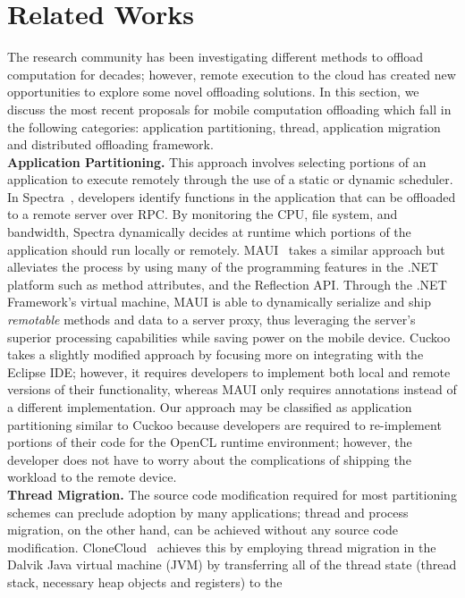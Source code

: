 \documentclass[10pt, conference, compsocconf]{IEEEtran}
\begin{document}
\section{Related Works}
%
The research community has been investigating different methods to
offload computation for decades; however, remote execution to the cloud
has created new opportunities to explore some novel offloading solutions.
%
In this section, we discuss the most recent proposals for mobile
computation offloading which fall in the following categories:
application partitioning, thread, application migration and distributed
offloading framework.\\
%
\indent\textbf{Application Partitioning.} This approach involves selecting
portions of an application to execute remotely through the use of a
static or dynamic scheduler.
%
In Spectra~\cite{spectra}, developers identify functions in the
application that can be offloaded to a remote server over RPC.
%
By monitoring the CPU, file system, and bandwidth, Spectra dynamically
decides at runtime which portions of the application should run locally
or remotely.
%
MAUI~\cite{maui} takes a similar approach but alleviates the process by
using many of the programming features in the .NET platform such as
method attributes, and the Reflection API.
%
Through the .NET Framework's virtual machine, MAUI is able to
dynamically serialize and ship \textit{remotable} methods and data to a
server proxy, thus leveraging the server's superior processing
capabilities while saving power on the mobile device.
%
Cuckoo~\cite{cuckoo} takes a slightly modified approach by focusing more
on integrating with the Eclipse IDE; however, it requires developers to
implement both local and remote versions of their functionality, whereas
MAUI only requires annotations instead of a different implementation.
%
Our approach may be classified as application partitioning similar to
Cuckoo because developers are required to re-implement portions of their
code for the OpenCL runtime environment; however, the developer does not
have to worry about the complications of shipping the workload to the
remote device.\\
%
\indent\textbf{Thread Migration.} The source code modification required for
most partitioning schemes can preclude adoption by many applications;
thread and process migration, on the other hand, can be achieved without
any source code modification.
%
CloneCloud~\cite{clonecloud} achieves this by employing thread migration
in the Dalvik Java virtual machine (JVM) by transferring all of the
thread state (thread stack, necessary heap objects and registers) to the
\end{document}
